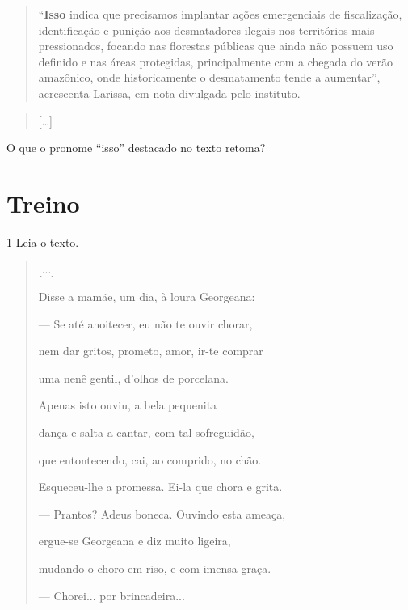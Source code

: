 \begin{quote}
``\textbf{Isso} indica que precisamos implantar ações emergenciais de
fiscalização, identificação e punição aos desmatadores ilegais nos
territórios mais pressionados, focando nas florestas públicas que ainda
não possuem uso definido e nas áreas protegidas, principalmente com a
chegada do verão amazônico, onde historicamente o desmatamento tende a
aumentar'', acrescenta Larissa, em nota divulgada pelo instituto.
\end{quote}

\begin{quote}
{[}\ldots{]}
\end{quote}


O que o pronome ``isso'' destacado no texto retoma?


\pagebreak

\section{Treino}

\num{1} Leia o texto.

\begin{quote}
{[}...{]}

Disse a mamãe, um dia, à loura Georgeana:

--- Se até anoitecer, eu não te ouvir chorar,

nem dar gritos, prometo, amor, ir-te comprar

uma nenê gentil, d'olhos de porcelana.

Apenas isto ouviu, a bela pequenita

dança e salta a cantar, com tal sofreguidão,

que entontecendo, cai, ao comprido, no chão.

Esqueceu-lhe a promessa. Ei-la que chora e grita.

--- Prantos? Adeus boneca. Ouvindo esta ameaça,

ergue-se Georgeana e diz muito ligeira,

mudando o choro em riso, e com imensa graça.

--- Chorei... por brincadeira...
\end{quote}

